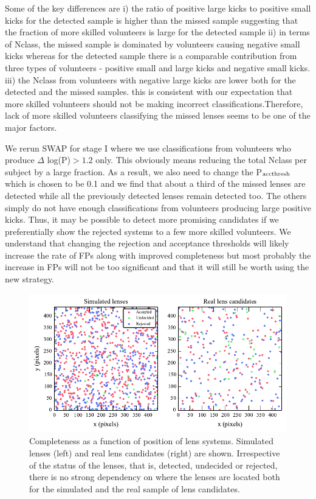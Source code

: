 \documentclass[useAMS,usenatbib,a4paper]{mn2e}
\begin{document}
Some of the key differences are i) the ratio of positive large kicks to
positive small kicks for the detected sample is higher than the missed
sample suggesting that the fraction of more skilled volunteers is large
for the detected sample ii) in terms of Nclass, the missed sample is
dominated by volunteers causing negative small kicks whereas for the
detected sample there is a comparable contribution from three types of
volunteers - positive small and large kicks and negative small kicks.
iii) the Nclass from volunteers with negative large kicks are lower both
for the detected and the missed samples. this is consistent with our
expectation that more skilled volunteers should not be making incorrect
classifications.Therefore, lack of more skilled volunteers classifying
the missed lenses seems to be one of the major factors. 

We rerun SWAP for stage I where we use classifications from volunteers
who produce $\Delta$ log(P)$>1.2$ only. This obviously means reducing
the total Nclass per subject by a large fraction. As a result, we also
need to change the P$_{\rm acc thresh}$ which is chosen to be 0.1 and we
find that about a third of the missed lenses are detected while all the
previously detected lenses remain detected too. The others simply do not
have enough classifications from volunteers producing large positive
kicks. Thus, it may be possible to detect more promising candidates if
we preferentially show the rejected systems to a few more skilled
volunteers. We understand that changing the rejection and acceptance
thresholds will likely increase the rate of FPs along with
improved completeness but most probably the increase in FPs will not be
too significant and that it will still be worth using the new strategy.


\begin{figure}
\begin{center}
\includegraphics[scale=0.95]{sw-cfhtls-figs/completeness_pos.pdf}
\caption{ \label{fig:comppos}
Completeness as a function of position of lens systems. Simulated lenses
(left) and real lens candidates (right) are shown. Irrespective of the
status of the lenses, that is, detected, undecided or rejected, there is
no strong dependency on where the lenses are located both for the
simulated and the real sample of lens candidates. }
\end{center}
\end{figure}
\end{document}
